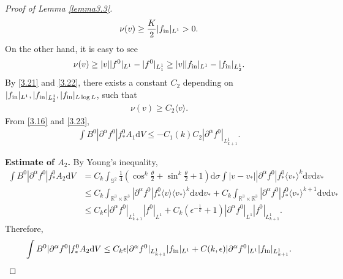 \documentclass[reqno,10pt]{amsart}
\let\pa=\partial
\let\al=\alpha
\def\pa{\partial}
\def\th{\theta}
\newcommand{\beq}{\begin{equation}}
\newcommand{\eeq}{\end{equation}}
\newcommand{\ben}{\begin{eqnarray}}
\newcommand{\een}{\end{eqnarray}}
\theoremstyle{definition}
\numberwithin{equation}{section}
\begin{document}
\begin{proof}[Proof of Lemma \ref{lemma3.3}]
\ben\label{3.21}
\nu(v)\ge \frac{K}{2}|f_{\textup{in}}|_{L^1}>0.
\een
On the other hand, it is easy to see
\beq\label{3.22}
\nu(v)\ge |v||f^0|_{L^1}-|f^0|_{L^1_1}\ge |v||f_{\textup{in}}|_{L^1}-|f_{\textup{in}}|_{L^1_2}.
\eeq
    By \eqref{3.21} and \eqref{3.22}, there exists a constant $C_2$ depending on $|f_{\textup{in}}|_{L^1},|f_{\textup{in}}|_{L^1_2},|f_{\textup{in}}|_{L\log L}$, such that 
    \ben\label{3.23}
\nu(v)\ge C_2\langle v \rangle .
    \een
    From \eqref{3.16} and \eqref{3.23},
\ben\label{3.24}
    \int B^0|\pa^{\al}f^0|f^0_*A_1\mathrm{d}V\le -C_1(k)C_2|\pa^{\al}f^0|_{L^1_{k+1}}.
\een

 \textbf{Estimate of $A_2$.} By Young's inequality,
$$
\begin{aligned}
\int B^0|\pa^{\al}f^0|f^0_* A_2\mathrm{d}V&= C_k\int_{\mathbb{S}^2}\frac{1}{4}(\cos^{k}\frac{\th}{2}+\sin^{k}\frac{\th}{2}+1)\mathrm{d}\sigma\int |v-v_*||\pa^{\al}f^0|f^0_*\langle v_*\rangle^{k}\mathrm{d}v\mathrm{d}v_*\\
&\le C_k\int_{\mathbb{R}^3\times\mathbb{R}^3}|\pa^{\al}f^0|f^0_*\langle v\rangle\langle v_*\rangle^{k}\mathrm{d}v\mathrm{d}v_*+
C_k\int_{\mathbb{R}^3\times\mathbb{R}^3}|\pa^{\al}f^0|f^0_*\langle v_*\rangle^{k+1}\mathrm{d}v\mathrm{d}v_*\\
&\le C_k\epsilon |\pa^{\al}f^0|_{L^1_{k+1}}|f^0|_{L^1}+C_k(\epsilon^{-\frac{1}{k}}+1)|\pa^{\al}f^0|_{L^1}|f^0|_{L^1_{k+1}}.
\end{aligned}
$$
Therefore,
\ben\label{3.25}
\int B^0|\pa^{\al}f^0|f^0_* A_2\mathrm{d}V\le C_k\epsilon |\pa^{\al}f^0|_{L^1_{k+1}}|f_{\textup{in}}|_{L^1}+C(k,\epsilon)|\pa^{\al}f^0|_{L^1}|f_{\textup{in}}|_{L^1_{k+1}}.
\een


\end{proof}
\end{document}

